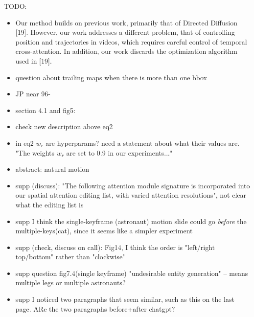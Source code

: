 TODO:
\begin{itemize}

    \item Our method builds on previous work, primarily that of Directed Diffusion [19]. However, our work addresses a different problem, that of controlling position and trajectories in videos, which requires careful control of temporal cross-attention. In addition, our work discards the optimization algorithm used in [19].


    \item question about trailing maps when there is more than one bbox

    \item JP near 96-

    \item section 4.1 and fig5: 

    \item check new description above eq2

    \item in eq2 $w_r$ are hyperparams? need a statement about what their values are. "The weights $w_r$ are set to 0.9 in our experiments..."

    \item abstract: natural motion
    
    \item supp (discuss): "The following attention module signature is incorporated into our spatial attention editing list, with varied attention resolutions", not clear what the editing list is

    \item supp I think the single-keyframe (astronaut) motion slide could go \emph{before} the multiple-keys(cat), since it seems like a simpler experiment

    \item supp (check, discuss on call): Fig14, I think the order is "left/right top/bottom" rather than "clockwise"

    \item supp question fig7.4(single keyframe) "undesirable entity generation" -- means multiple legs or multiple astronauts?

    \item supp I noticed two paragraphs that seem similar, such as this on the last page. ARe the two paragraphs before+after chatgpt?
    

\end{itemize}
